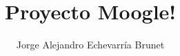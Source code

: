 \documentclass{beamer}
\title{Proyecto Moogle!}
\author{Jorge Alejandro Echevarría Brunet}
\institute{Facultad de Matemática y Computación\\Universidad de la Habana}
\date{}
\begin{document}
\begin{frame}
	\titlepage
\end{frame}




\end{document}
